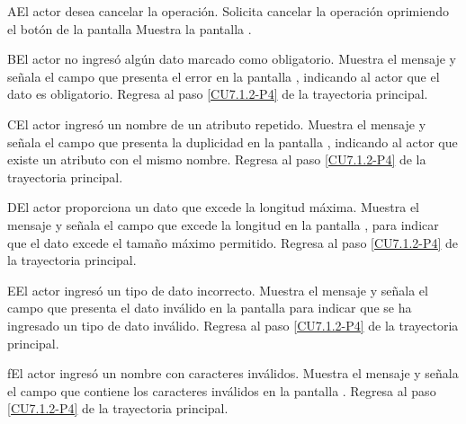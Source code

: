 	\begin{UCtrayectoriaA}{A}{El actor desea cancelar la operación.}
		\UCpaso[\UCactor] Solicita cancelar la operación oprimiendo el botón  de la pantalla 
		\UCpaso[\UCsist] Muestra la pantalla .
	\end{UCtrayectoriaA}

	\begin{UCtrayectoriaA}{B}{El actor no ingresó algún dato marcado como obligatorio.}
		\UCpaso[\UCsist] Muestra el mensaje  y señala el campo que presenta el error en la pantalla , indicando al actor que el dato es obligatorio.
		\UCpaso Regresa al paso \ref{CU7.1.2-P4} de la trayectoria principal.
	\end{UCtrayectoriaA}
	
	\begin{UCtrayectoriaA}{C}{El actor ingresó un nombre de un atributo repetido.}
		\UCpaso[\UCsist] Muestra el mensaje  y señala el campo que presenta la duplicidad en la pantalla , indicando al actor que existe un atributo con el mismo nombre.
		\UCpaso Regresa al paso \ref{CU7.1.2-P4} de la trayectoria principal.
	\end{UCtrayectoriaA}

	\begin{UCtrayectoriaA}{D}{El actor proporciona un dato que excede la longitud máxima.}
		\UCpaso[\UCsist] Muestra el mensaje  y señala el campo que excede la longitud en la pantalla , para indicar que el dato excede el tamaño máximo permitido.
		\UCpaso Regresa al paso \ref{CU7.1.2-P4} de la trayectoria principal.
	\end{UCtrayectoriaA}

	\begin{UCtrayectoriaA}{E}{El actor ingresó un tipo de dato incorrecto.}
		\UCpaso[\UCsist] Muestra el mensaje  y señala el campo que presenta el dato inválido en la pantalla  para indicar que se ha ingresado un tipo de dato inválido.
		\UCpaso Regresa al paso \ref{CU7.1.2-P4} de la trayectoria principal.
	\end{UCtrayectoriaA}

	\begin{UCtrayectoriaA}{f}{El actor ingresó un nombre con caracteres inválidos.}
	\UCpaso[\UCsist] Muestra el mensaje  y señala el campo que contiene los caracteres inválidos en la pantalla .
	\UCpaso Regresa al paso \ref{CU7.1.2-P4} de la trayectoria principal.
	\end{UCtrayectoriaA}

